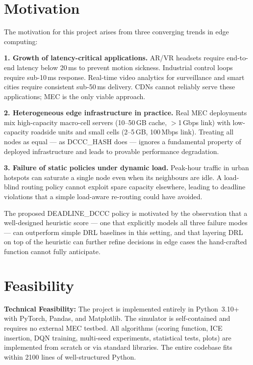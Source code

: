 \documentclass[12pt,a4paper]{report}
\begin{document}
\section{Motivation}

The motivation for this project arises from three converging trends in edge computing:

\textbf{1. Growth of latency-critical applications.}
AR/VR headsets require end-to-end latency below 20\,ms to prevent motion sickness.
Industrial control loops require sub-10\,ms response. Real-time video analytics for surveillance
and smart cities require consistent sub-50\,ms delivery. CDNs cannot reliably serve these
applications; MEC is the only viable approach.

\textbf{2. Heterogeneous edge infrastructure in practice.}
Real MEC deployments mix high-capacity macro-cell servers (10--50\,GB cache, $>$1\,Gbps
link) with low-capacity roadside units and small cells (2--5\,GB, 100\,Mbps link). Treating
all nodes as equal --- as DCCC\_HASH does --- ignores a fundamental property of deployed
infrastructure and leads to provable performance degradation.

\textbf{3. Failure of static policies under dynamic load.}
Peak-hour traffic in urban hotspots can saturate a single node even when its neighbours
are idle. A load-blind routing policy cannot exploit spare capacity elsewhere, leading to
deadline violations that a simple load-aware re-routing could have avoided.

The proposed DEADLINE\_DCCC policy is motivated by the observation that a well-designed
heuristic score --- one that explicitly models all three failure modes --- can outperform simple
DRL baselines in this setting, and that layering DRL on top of the heuristic can further
refine decisions in edge cases the hand-crafted function cannot fully anticipate.

\section{Feasibility}

\textbf{Technical Feasibility:}
The project is implemented entirely in Python~3.10+ with PyTorch, Pandas, and Matplotlib.
The simulator is self-contained and requires no external MEC testbed. All algorithms
(scoring function, ICE insertion, DQN training, multi-seed experiments, statistical tests,
plots) are implemented from scratch or via standard libraries. The entire codebase fits within
2100 lines of well-structured Python.
\end{document}
